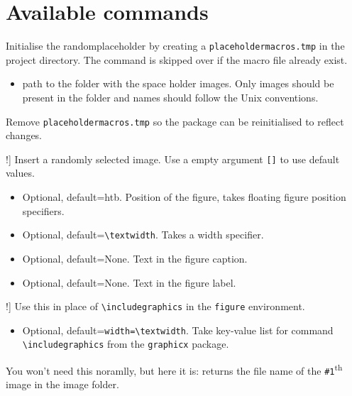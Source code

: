 \documentclass[12pt]{article}
\begin{document}
    \section{Available commands}
    \begin{description}
        \item[\lstinline!\placeholderinit{#1}!] 
        Initialise the randomplaceholder by creating a \linebreak \lstinline!placeholdermacros.tmp! in the project directory. The command is skipped over if the macro file already exist.
            \begin{itemize}
                \item[\lstinline!#1!] path to the folder with the space holder images. Only images should be present in the folder and names should follow the Unix conventions.
            \end{itemize}
        \item[\lstinline!\placeholderclean!] Remove \lstinline!placeholdermacros.tmp! so the package can be reinitialised to reflect changes. 
        \item[\lstinline!\placeholder[#1][#2][#3][#4]!] Insert a randomly selected image. Use a empty argument \lstinline{[]} to use default values.
            \begin{itemize}
                \item[\lstinline{#1}] Optional, default=htb. Position of the figure, takes floating figure position specifiers.
                \item[\lstinline{#2}] Optional, default=\lstinline{\textwidth}. Takes a width specifier.
                \item[\lstinline{#3}] Optional, default=None. Text in the figure caption.
                \item[\lstinline{#4}] Optional, default=None. Text in the figure label.  
            \end{itemize}
        \item[\lstinline!\includeplaceholder[#1]!] Use this in place of \lstinline!\includegraphics! in the \lstinline{figure} environment.
            \begin{itemize}
                \item[\lstinline{#1}] Optional, default=\lstinline{width=\textwidth}. Take key-value list for command \lstinline{\includegraphics} from the \lstinline{graphicx} package.
            \end{itemize}
        \item[\lstinline!\placeholderimage{#1}!] You won't need this noramlly, but here it is: returns the file name of the \lstinline{#1}\textsuperscript{th} image in the image folder. 
    \end{description}
\end{document}
